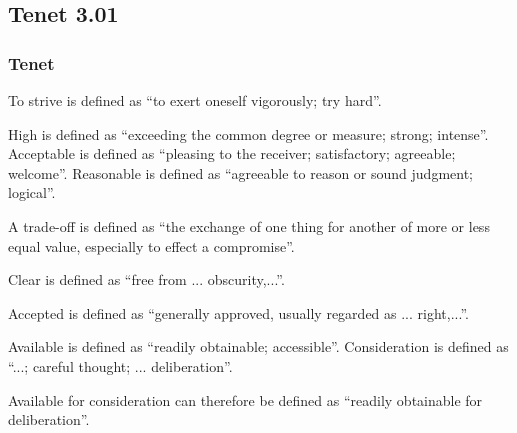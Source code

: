 \subsection{Tenet 3.01}
\subsubsection{Tenet}

To strive is defined as ``to exert oneself vigorously; try hard''\cite{dictionary_com}.

High is defined as ``exceeding the common degree or measure; strong; intense''. Acceptable is defined as ``pleasing to the receiver; satisfactory; agreeable; welcome''\cite{dictionary_com}. Reasonable is defined as ``agreeable to reason or sound judgment; logical''\cite{dictionary_com}.

A trade-off is defined as ``the exchange of one thing for another of more or less equal value, especially to effect a compromise''\cite{dictionary_com}.

Clear is defined as ``free from ... obscurity,...''\cite{dictionary_com}.

Accepted is defined as ``generally approved, usually regarded as ... right,...''\cite{dictionary_com}.

Available is defined as ``readily obtainable; accessible''\cite{dictionary_com}. Consideration is defined as ``...; careful thought; ... deliberation''\cite{dictionary_com}.

Available for consideration can therefore be defined as ``readily obtainable for deliberation''.


